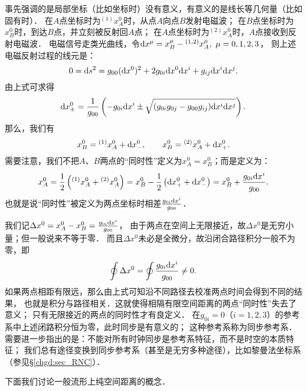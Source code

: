 事先强调的是局部坐标（比如坐标时）没有意义，有意义的是线长等几何量（比如固有时）．
在$A$点坐标时为${}^{(1)}x_A^0$时，从点$A$向点$B$发射电磁波；
在$B$点坐标时为$x_B^0$时，到达$B$点，并立刻被反射回$A$点；
在$A$点坐标时为${}^{(2)}x_A^0$时，$A$点接收到反射电磁波．
电磁信号走类光曲线，令${\rm d} x^\mu = x_B^\mu-{}^{(1,2)}x_A^\mu,\  \mu=0,1,2,3$，
则上述电磁反射过程的线元是：
\begin{equation}
    0 = {\rm d}s^2 = g_{00} ({\rm d}x^0)^2 + 2 g_{0i}{\rm d}x^0 {\rm d}x^i
    + g_{ij} {\rm d}x^i {\rm d}x^j .
\end{equation}
由上式可求得
\begin{equation}
    {\rm d}x^0_{\pm} = \frac{1}{g_{00}}\left( - g_{0i}{\rm d}x^i \pm
    \sqrt{(g_{0i}g_{0j}-g_{00}g_{ij}){\rm d}x^i {\rm d}x^j}\right).
\end{equation}
那么，我们有
\begin{equation}
    x^0_B = {}^{(1)}x_A^0 + {\rm d}x^0_{-} , \qquad
    x^0_B = {}^{(2)}x_A^0 + {\rm d}x^0_{+} .
\end{equation}
需要注意，我们不把$A$、$B$两点的“同时性”定义为$x_A^0=x_B^0$；而是定义为：
\begin{equation}
    x_A^0= \frac{1}{2}\left( {}^{(1)}x_A^0 + {}^{(2)}x_A^0 \right)
    =x^0_B-\frac{1}{2}\left( {\rm d}x^0_{+} + {\rm d}x^0_{-} \right)
    =x^0_B+\frac{g_{0i}{\rm d}x^i}{g_{00}}.
\end{equation}
也就是说“同时性”被定义为两点坐标时相差$\frac{g_{0i}{\rm d}x^i}{g_{00}}$．

我们记$\Delta x^0 = x_A^0-x_B^0=\frac{g_{0i}{\rm d}x^i}{g_{00}}$，
由于两点在空间上无限接近，故$\Delta x^0$是无穷小量；但一般说来不等于零．
而且$\Delta x^0$未必是全微分，故沿闭合路径积分一般不为零，即
\begin{equation}
    \oint \Delta x^0 = \oint \frac{g_{0i}{\rm d}x^i}{g_{00}} \neq 0 .
\end{equation}
如果两点相距有限远，那么由上式可知沿不同路径去校准两点时间会得到不同的结果，
也就是积分与路径相关．这就使得相隔有限空间距离的两点“同时性”失去了意义；
只有无限接近的两点的同时性才有良定义．
在$g_{0i}=0$（$i=1,2,3$）的参考系中上述闭路积分恒为零，此时同步是有意义的；
这种参考系称为{\heiti 同步参考系}．
需要进一步指出的是：不能对所有时钟同步是参考系特征，而不是时空的本质特征；
我们总有途径变换到同步参考系（甚至是无穷多种途径），比如黎曼法坐标系（参见\S\ref{chgd:sec_RNC}）．



下面我们讨论一般流形上纯空间距离的概念．

